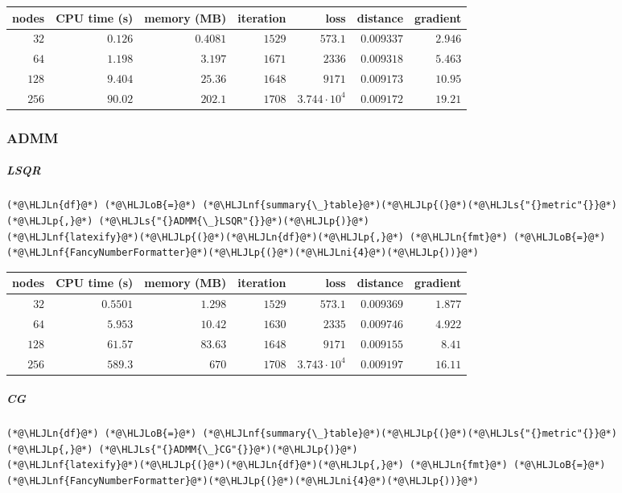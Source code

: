 \documentclass[12pt,a4paper]{article}
\newcommand{\HLJLn}[1]{#1}
\newcommand{\HLJLnf}[1]{\textcolor[RGB]{66,102,213}{#1}}
\newcommand{\HLJLs}[1]{\textcolor[RGB]{201,61,57}{#1}}
\newcommand{\HLJLni}[1]{\textcolor[RGB]{59,151,46}{#1}}
\newcommand{\HLJLoB}[1]{\textcolor[RGB]{102,102,102}{\textbf{#1}}}
\newcommand{\HLJLp}[1]{#1}
\begin{document}
\begin{tabular}
{r | r | r | r | r | r | r}
nodes & CPU time (s) & memory (MB) & iteration & loss & distance & gradient \\
\hline
$32$ & $0.126$ & $0.4081$ & $1529$ & $573.1$ & $0.009337$ & $2.946$ \\
$64$ & $1.198$ & $3.197$ & $1671$ & $2336$ & $0.009318$ & $5.463$ \\
$128$ & $9.404$ & $25.36$ & $1648$ & $9171$ & $0.009173$ & $10.95$ \\
$256$ & $90.02$ & $202.1$ & $1708$ & $3.744 \cdot 10^{4}$ & $0.009172$ & $19.21$ \\
\end{tabular}


\subsubsection{ADMM}
\subparagraph{LSQR}

\begin{lstlisting}
(*@\HLJLn{df}@*) (*@\HLJLoB{=}@*) (*@\HLJLnf{summary{\_}table}@*)(*@\HLJLp{(}@*)(*@\HLJLs{"{}metric"{}}@*)(*@\HLJLp{,}@*) (*@\HLJLs{"{}ADMM{\_}LSQR"{}}@*)(*@\HLJLp{)}@*)
(*@\HLJLnf{latexify}@*)(*@\HLJLp{(}@*)(*@\HLJLn{df}@*)(*@\HLJLp{,}@*) (*@\HLJLn{fmt}@*) (*@\HLJLoB{=}@*) (*@\HLJLnf{FancyNumberFormatter}@*)(*@\HLJLp{(}@*)(*@\HLJLni{4}@*)(*@\HLJLp{))}@*)
\end{lstlisting}


\begin{tabular}
{r | r | r | r | r | r | r}
nodes & CPU time (s) & memory (MB) & iteration & loss & distance & gradient \\
\hline
$32$ & $0.5501$ & $1.298$ & $1529$ & $573.1$ & $0.009369$ & $1.877$ \\
$64$ & $5.953$ & $10.42$ & $1630$ & $2335$ & $0.009746$ & $4.922$ \\
$128$ & $61.57$ & $83.63$ & $1648$ & $9171$ & $0.009155$ & $8.41$ \\
$256$ & $589.3$ & $670$ & $1708$ & $3.743 \cdot 10^{4}$ & $0.009197$ & $16.11$ \\
\end{tabular}


\subparagraph{CG}

\begin{lstlisting}
(*@\HLJLn{df}@*) (*@\HLJLoB{=}@*) (*@\HLJLnf{summary{\_}table}@*)(*@\HLJLp{(}@*)(*@\HLJLs{"{}metric"{}}@*)(*@\HLJLp{,}@*) (*@\HLJLs{"{}ADMM{\_}CG"{}}@*)(*@\HLJLp{)}@*)
(*@\HLJLnf{latexify}@*)(*@\HLJLp{(}@*)(*@\HLJLn{df}@*)(*@\HLJLp{,}@*) (*@\HLJLn{fmt}@*) (*@\HLJLoB{=}@*) (*@\HLJLnf{FancyNumberFormatter}@*)(*@\HLJLp{(}@*)(*@\HLJLni{4}@*)(*@\HLJLp{))}@*)
\end{lstlisting}
\end{document}
